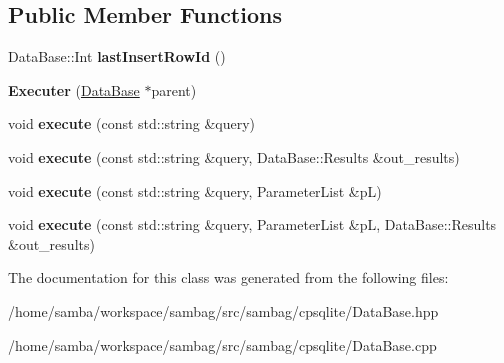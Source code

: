 \subsection*{Public Member Functions}
\begin{DoxyCompactItemize}
\item 
\hypertarget{classsambag_1_1cpsqlite_1_1_data_base_1_1_executer_ace2984791e378cdc907972cfdc47c4f7}{
DataBase::Int {\bfseries lastInsertRowId} ()}
\label{classsambag_1_1cpsqlite_1_1_data_base_1_1_executer_ace2984791e378cdc907972cfdc47c4f7}

\item 
\hypertarget{classsambag_1_1cpsqlite_1_1_data_base_1_1_executer_aa4bda8797ed57fd964c1b6273bd12631}{
{\bfseries Executer} (\hyperlink{classsambag_1_1cpsqlite_1_1_data_base}{DataBase} $\ast$parent)}
\label{classsambag_1_1cpsqlite_1_1_data_base_1_1_executer_aa4bda8797ed57fd964c1b6273bd12631}

\item 
\hypertarget{classsambag_1_1cpsqlite_1_1_data_base_1_1_executer_a99fb6e9657c11127406a6da6b0cca162}{
void {\bfseries execute} (const std::string \&query)}
\label{classsambag_1_1cpsqlite_1_1_data_base_1_1_executer_a99fb6e9657c11127406a6da6b0cca162}

\item 
\hypertarget{classsambag_1_1cpsqlite_1_1_data_base_1_1_executer_acd8d2dc2d210c44bd9f8116420a114bb}{
void {\bfseries execute} (const std::string \&query, DataBase::Results \&out\_\-results)}
\label{classsambag_1_1cpsqlite_1_1_data_base_1_1_executer_acd8d2dc2d210c44bd9f8116420a114bb}

\item 
\hypertarget{classsambag_1_1cpsqlite_1_1_data_base_1_1_executer_ab6120474c7b0235045a536fde65a6450}{
void {\bfseries execute} (const std::string \&query, ParameterList \&pL)}
\label{classsambag_1_1cpsqlite_1_1_data_base_1_1_executer_ab6120474c7b0235045a536fde65a6450}

\item 
\hypertarget{classsambag_1_1cpsqlite_1_1_data_base_1_1_executer_adc3895efbfdaba6c4270cbe0ab38936a}{
void {\bfseries execute} (const std::string \&query, ParameterList \&pL, DataBase::Results \&out\_\-results)}
\label{classsambag_1_1cpsqlite_1_1_data_base_1_1_executer_adc3895efbfdaba6c4270cbe0ab38936a}

\end{DoxyCompactItemize}


The documentation for this class was generated from the following files:\begin{DoxyCompactItemize}
\item 
/home/samba/workspace/sambag/src/sambag/cpsqlite/DataBase.hpp\item 
/home/samba/workspace/sambag/src/sambag/cpsqlite/DataBase.cpp\end{DoxyCompactItemize}
